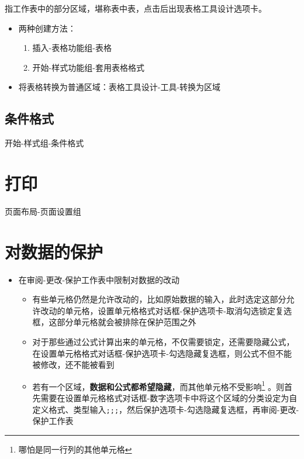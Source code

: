 \documentclass[]{ctexbook}
\providecommand{\tightlist}{%
  \setlength{\itemsep}{0pt}\setlength{\parskip}{0pt}}
\begin{document}
指工作表中的部分区域，堪称表中表，点击后出现表格工具\textbar 设计选项卡。

\begin{itemize}
\tightlist
\item
  两种创建方法：

  \begin{enumerate}
  \def\labelenumi{\arabic{enumi}.}
  \tightlist
  \item
    插入-表格功能组-表格
  \item
    开始-样式功能组-套用表格格式
  \end{enumerate}
\item
  将表格转换为普通区域：表格工具\textbar 设计-工具-转换为区域
\end{itemize}

\hypertarget{ux6761ux4ef6ux683cux5f0f}{%
\subsection{条件格式}\label{ux6761ux4ef6ux683cux5f0f}}

开始-样式组-条件格式

\hypertarget{ux6253ux5370}{%
\section{打印}\label{ux6253ux5370}}

页面布局-页面设置组

\hypertarget{ux5bf9ux6570ux636eux7684ux4fddux62a4}{%
\section{对数据的保护}\label{ux5bf9ux6570ux636eux7684ux4fddux62a4}}

\begin{itemize}
\tightlist
\item
  在审阅-更改-保护工作表中限制对数据的改动

  \begin{itemize}
  \tightlist
  \item
    有些单元格仍然是允许改动的，比如原始数据的输入，此时选定这部分允许改动的单元格，设置单元格格式对话框-保护选项卡-取消勾选锁定复选框，这部分单元格就会被排除在保护范围之外
  \item
    对于那些通过公式计算出来的单元格，不仅需要锁定，还需要隐藏公式，在设置单元格格式对话框-保护选项卡-勾选隐藏复选框，则公式不但不能被修改，还不能被看到
  \item
    若有一个区域，\textbf{数据和公式都希望隐藏}，而其他单元格不受影响\footnote{哪怕是同一行列的其他单元格} 。则首先需要在设置单元格格式对话框-数字选项卡中将这个区域的分类设定为自定义格式、类型输入\texttt{;;;}，然后保护选项卡-勾选隐藏复选框，再审阅-更改-保护工作表
  \end{itemize}
\end{itemize}
\end{document}
